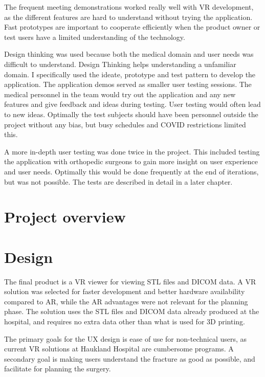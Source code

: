 \documentclass[a4paper]{report}
\begin{document}
The frequent meeting demonstrations worked really well with VR development, as the different features are hard to understand without trying the application. Fast prototypes are important to cooperate efficiently when the product owner or test users have a limited understanding of the technology.


Design thinking was used because both the medical domain and user needs was difficult to understand. Design Thinking helps understanding a unfamiliar domain. I specifically used the ideate, prototype and test pattern to develop the application.
The application demos served as smaller user testing sessions. The medical personnel in the team would try out the application and any new features and give feedback and ideas during testing. User testing would often lead to new ideas. Optimally the test subjects should have been personnel outside the project without any bias, but busy schedules and COVID restrictions limited this.

A more in-depth user testing was done twice in the project. This included testing the application with orthopedic surgeons to gain more insight on user experience and user needs. Optimally this would be done frequently at the end of iterations, but was not possible. The tests are described in detail in a later chapter.

\section{Project overview}\label{CodeStructure}

\section{Design}


The final product is a VR viewer for viewing STL files and DICOM data. A VR solution was selected for faster development and better hardware availability compared to AR, while the AR advantages were not relevant for the planning phase.
The solution uses the STL files and DICOM data already produced at the hospital, and requires no extra data other than what is used for 3D printing.

The primary goals for the UX design is ease of use for non-technical users, as current VR solutions at Haukland Hospital are cumbersome programs.
A secondary goal is making users understand the fracture as good as possible, and facilitate for planning the surgery.
\end{document}
